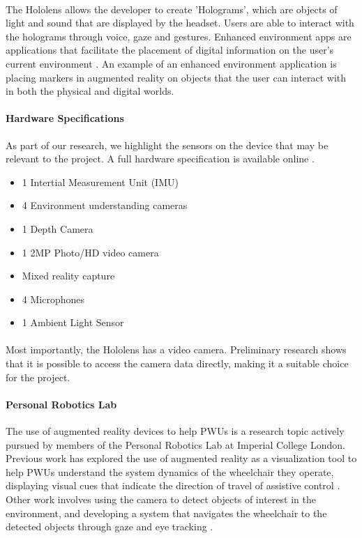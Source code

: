 \paragraph{}The Hololens allows the developer to create 'Holograms', which are objects of light and sound that are displayed by the headset. Users are able to interact with the holograms through voice, gaze and gestures. Enhanced environment apps are applications that facilitate the placement of digital information on the user's current environment \citep{Microsofta}. An example of an enhanced environment application is placing markers in augmented reality on objects that the user can interact with in both the physical and digital worlds. 

\paragraph{Hardware Specifications} As part of our research, we highlight the sensors on the device that may be relevant to the project. A full hardware specification is available online \cite{Microsoft2015}. 

\begin{itemize}
	\item 1 Intertial Measurement Unit (IMU)
	\item 4 Environment understanding cameras
	\item 1 Depth Camera
	\item 1 2MP Photo/HD video camera
	\item Mixed reality capture
	\item 4 Microphones
	\item 1 Ambient Light Sensor
\end{itemize}

\paragraph{} Most importantly, the Hololens has a video camera. Preliminary research shows that it is possible to access the camera data directly, making it a suitable choice for the project.

\paragraph{Personal Robotics Lab} The use of augmented reality devices to help PWUs is a research topic actively pursued by members of the Personal Robotics Lab at Imperial College London. Previous work has explored the use of augmented reality as a visualization tool to help PWUs understand the system dynamics of the wheelchair they operate, displaying visual cues that indicate the direction of travel of assistive control \cite{Zolotas2018}. Other work involves using the camera to detect objects of interest in the environment, and developing a system that navigates the wheelchair to the detected objects through gaze and eye tracking \cite{Chacon-Quesada}.

